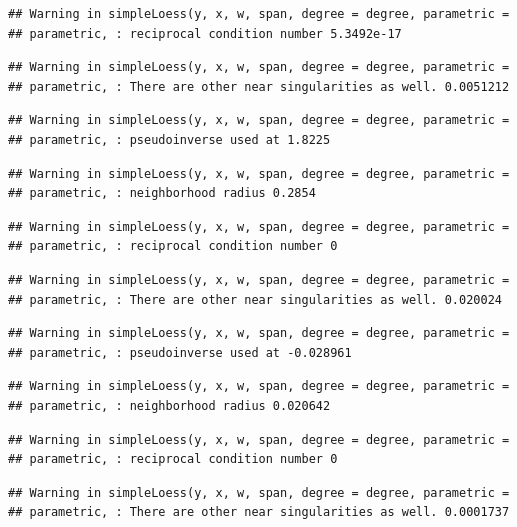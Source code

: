 \documentclass[]{article}
\begin{document}
\begin{verbatim}
## Warning in simpleLoess(y, x, w, span, degree = degree, parametric =
## parametric, : reciprocal condition number 5.3492e-17
\end{verbatim}

\begin{verbatim}
## Warning in simpleLoess(y, x, w, span, degree = degree, parametric =
## parametric, : There are other near singularities as well. 0.0051212
\end{verbatim}

\begin{verbatim}
## Warning in simpleLoess(y, x, w, span, degree = degree, parametric =
## parametric, : pseudoinverse used at 1.8225
\end{verbatim}

\begin{verbatim}
## Warning in simpleLoess(y, x, w, span, degree = degree, parametric =
## parametric, : neighborhood radius 0.2854
\end{verbatim}

\begin{verbatim}
## Warning in simpleLoess(y, x, w, span, degree = degree, parametric =
## parametric, : reciprocal condition number 0
\end{verbatim}

\begin{verbatim}
## Warning in simpleLoess(y, x, w, span, degree = degree, parametric =
## parametric, : There are other near singularities as well. 0.020024
\end{verbatim}

\begin{verbatim}
## Warning in simpleLoess(y, x, w, span, degree = degree, parametric =
## parametric, : pseudoinverse used at -0.028961
\end{verbatim}

\begin{verbatim}
## Warning in simpleLoess(y, x, w, span, degree = degree, parametric =
## parametric, : neighborhood radius 0.020642
\end{verbatim}

\begin{verbatim}
## Warning in simpleLoess(y, x, w, span, degree = degree, parametric =
## parametric, : reciprocal condition number 0
\end{verbatim}

\begin{verbatim}
## Warning in simpleLoess(y, x, w, span, degree = degree, parametric =
## parametric, : There are other near singularities as well. 0.0001737
\end{verbatim}
\end{document}
